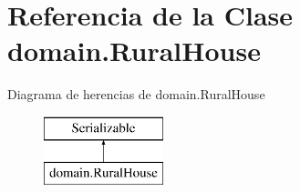 \hypertarget{classdomain_1_1_rural_house}{}\section{Referencia de la Clase domain.\+Rural\+House}
\label{classdomain_1_1_rural_house}
Diagrama de herencias de domain.\+Rural\+House\begin{figure}[H]
\begin{center}
\leavevmode
\includegraphics[height=2.000000cm]{classdomain_1_1_rural_house}
\end{center}
\end{figure}
